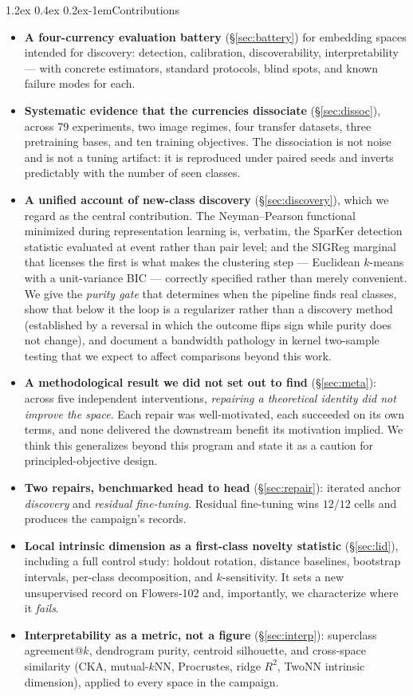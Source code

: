 \documentclass{article}
\makeatletter
\renewcommand\paragraph{\@startsection{paragraph}{4}{\z@}%
  {1.2ex \@plus 0.4ex \@minus 0.2ex}{-1em}{\normalsize\bf}}
\makeatother
\begin{document}
\paragraph{Contributions}
\begin{itemize}\itemsep2pt
\item \textbf{A four-currency evaluation battery} (\S\ref{sec:battery}) for
embedding spaces intended for discovery: detection, calibration,
discoverability, interpretability --- with concrete estimators, standard
protocols, blind spots, and known failure modes for each.
\item \textbf{Systematic evidence that the currencies dissociate}
(\S\ref{sec:dissoc}), across 79 experiments, two image regimes, four transfer
datasets, three pretraining bases, and ten training objectives. The
dissociation is not noise and is not a tuning artifact: it is reproduced under
paired seeds and inverts predictably with the number of seen classes.
\item \textbf{A unified account of new-class discovery} (\S\ref{sec:discovery}),
which we regard as the central contribution. The Neyman--Pearson functional
minimized during representation learning is, verbatim, the SparKer detection
statistic evaluated at event rather than pair level; and the SIGReg marginal
that licenses the first is what makes the clustering step --- Euclidean
$k$-means with a unit-variance BIC --- correctly specified rather than merely
convenient. We give the \emph{purity gate} that determines when the pipeline
finds real classes, show that below it the loop is a regularizer rather than a
discovery method (established by a reversal in which the outcome flips sign
while purity does not change), and document a bandwidth pathology in kernel
two-sample testing that we expect to affect comparisons beyond this work.
\item \textbf{A methodological result we did not set out to find}
(\S\ref{sec:meta}): across five independent interventions, \emph{repairing a
theoretical identity did not improve the space}. Each repair was
well-motivated, each succeeded on its own terms, and none delivered the
downstream benefit its motivation implied. We think this generalizes beyond
this program and state it as a caution for principled-objective design.
\item \textbf{Two repairs, benchmarked head to head} (\S\ref{sec:repair}):
iterated anchor \emph{discovery} and \emph{residual fine-tuning}. Residual
fine-tuning wins $12/12$ cells and produces the campaign's records.
\item \textbf{Local intrinsic dimension as a first-class novelty statistic}
(\S\ref{sec:lid}), including a full control study: holdout rotation, distance
baselines, bootstrap intervals, per-class decomposition, and $k$-sensitivity.
It sets a new unsupervised record on Flowers-102 and, importantly, we
characterize where it \emph{fails}.
\item \textbf{Interpretability as a metric, not a figure}
(\S\ref{sec:interp}): superclass agreement@$k$, dendrogram purity, centroid
silhouette, and cross-space similarity (CKA, mutual-$k$NN, Procrustes, ridge
$R^2$, TwoNN intrinsic dimension), applied to every space in the campaign.
\end{itemize}
\end{document}

